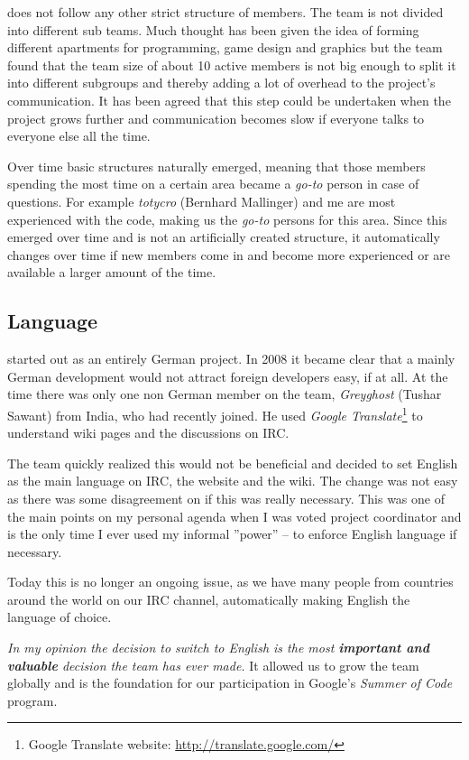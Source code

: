 \UH{} does not follow any other strict structure of members. The team is not divided into different sub teams. Much
thought has been given the idea of forming different apartments for programming, game design and graphics but the team
found that the team size of about 10 active members is not big enough to split it into different subgroups and thereby
adding a lot of overhead to the project's communication. It has been agreed that this step could be undertaken when the
project grows further and communication becomes slow if everyone talks to everyone else all the time.

Over time basic structures naturally emerged, meaning that those members spending the most time on a certain area became a
\textit{go-to} person in case of questions. For example \textit{totycro} (Bernhard Mallinger) and me are most
experienced with the code, making us the \textit{go-to} persons for this area. Since this emerged over time and is not
an artificially created structure, it automatically changes over time if new members come in and become more experienced
or are available a larger amount of the time.

\subsection{Language}
\UH{} started out as an entirely German project. In 2008 it became clear that a
mainly German development would not attract foreign developers easy, if at all. At the time there was only one non German
member on the team, \textit{Greyghost} (Tushar Sawant) from India, who had recently joined. He used \textit{Google
Translate}\footnote{Google Translate website: \url{http://translate.google.com/}} to understand wiki pages and the discussions on IRC.

The team quickly realized this would not be beneficial and decided to set English as the main language on IRC, the
website and the wiki. The change was not easy as there was some disagreement on if this was really necessary. This was one
of the main points on my personal agenda when I was voted project coordinator and is the only time I ever used my
informal ''power'' -- to enforce English language if necessary.

Today this is no longer an ongoing issue, as we have many people from countries around the world on our IRC channel,
automatically making English the language of choice.

\textit{In my opinion the decision to switch to English is the most \textbf{important and valuable} decision the team
has ever made.} It allowed us to grow the team globally and is the foundation for our participation in Google's \textit{Summer
of Code} program.

